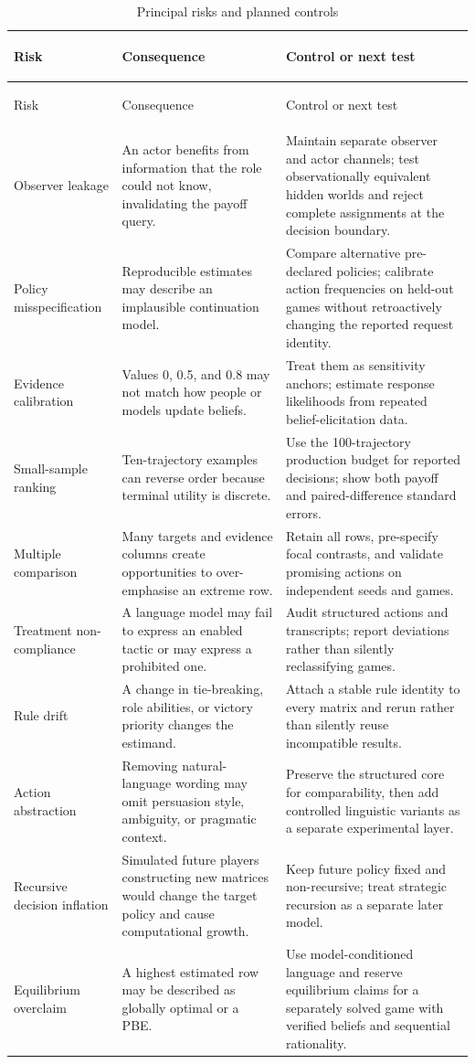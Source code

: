 \documentclass[11pt,a4paper]{article}
\begin{document}
\begin{longtable}{>{\bfseries\raggedright\arraybackslash}p{}>{\raggedright\arraybackslash}p{}>{\raggedright\arraybackslash}p{}}
\caption{Principal risks and planned controls}\\
\toprule
Risk & Consequence & Control or next test \\
\midrule
\endfirsthead
\toprule
Risk & Consequence & Control or next test \\
\midrule
\endhead
Observer leakage & An actor benefits from information that the role could not know, invalidating the payoff query. & Maintain separate observer and actor channels; test observationally equivalent hidden worlds and reject complete assignments at the decision boundary. \\
Policy misspecification & Reproducible estimates may describe an implausible continuation model. & Compare alternative pre-declared policies; calibrate action frequencies on held-out games without retroactively changing the reported request identity. \\
Evidence calibration & Values 0, 0.5, and 0.8 may not match how people or models update beliefs. & Treat them as sensitivity anchors; estimate response likelihoods from repeated belief-elicitation data. \\
Small-sample ranking & Ten-trajectory examples can reverse order because terminal utility is discrete. & Use the 100-trajectory production budget for reported decisions; show both payoff and paired-difference standard errors. \\
Multiple comparison & Many targets and evidence columns create opportunities to over-emphasise an extreme row. & Retain all rows, pre-specify focal contrasts, and validate promising actions on independent seeds and games. \\
Treatment non-compliance & A language model may fail to express an enabled tactic or may express a prohibited one. & Audit structured actions and transcripts; report deviations rather than silently reclassifying games. \\
Rule drift & A change in tie-breaking, role abilities, or victory priority changes the estimand. & Attach a stable rule identity to every matrix and rerun rather than silently reuse incompatible results. \\
Action abstraction & Removing natural-language wording may omit persuasion style, ambiguity, or pragmatic context. & Preserve the structured core for comparability, then add controlled linguistic variants as a separate experimental layer. \\
Recursive decision inflation & Simulated future players constructing new matrices would change the target policy and cause computational growth. & Keep future policy fixed and non-recursive; treat strategic recursion as a separate later model. \\
Equilibrium overclaim & A highest estimated row may be described as globally optimal or a PBE. & Use model-conditioned language and reserve equilibrium claims for a separately solved game with verified beliefs and sequential rationality. \\
\bottomrule
\end{longtable}
\end{document}

